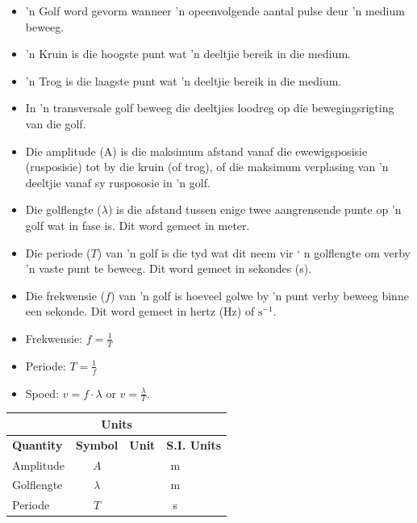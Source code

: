 \begin{definition}
            \nopagebreak
      \label{m38806*id324089}\begin{itemize}[noitemsep] 
            \label{m38806*uid108}\item 'n Golf word gevorm wanneer 'n opeenvolgende aantal pulse deur 'n medium beweeg.
\label{m38806*uid109}\item  'n Kruin is die hoogste punt wat  'n deeltjie bereik in die medium.
\label{m38806*uid110}\item 'n Trog is die laagste punt wat  'n deeltjie bereik in die medium.
\label{m38806*uid111}\item In 'n transversale golf beweeg die deeltjies loodreg op die bewegingsrigting van die golf.
\label{m38806*uid112}\item Die amplitude (A) is die maksimum afstand vanaf die ewewigsposisie (rusposisie) tot by die kruin 
       (of trog), of die maksimum verplasing van 'n deeltjie vanaf sy ruspososie in 'n golf.
\label{m38806*uid113}\item Die golflengte ($\lambda $) is die afstand tussen enige twee aangrensende punte op 'n golf wat in
         fase is. Dit word gemeet in meter.
\label{m38806*uid114}\item Die periode ($T$) van 'n golf is die tyd wat dit neem vir  ‘ n golflengte om verby  'n vaste punt te beweeg.
       Dit word gemeet in sekondes (s).
\label{m38806*uid115}\item Die frekwensie ($f$) van 'n golf is hoeveel golwe by 'n punt verby beweeg binne een sekonde. Dit word
       gemeet in hertz (Hz) of $\text{s}{}^{-1}$.
\label{m38806*uid116}\item Frekwensie: $f=\frac{1}{T}$\label{m38806*uid117}\item Periode: $T=\frac{1}{f}$\label{m38806*uid118}\item Spoed: $v=f\cdot\lambda $ or $v=\frac{\lambda }{T}$.
\end{itemize}
\begin{table}[H]
\begin{center}
\begin{tabular}{|l|c|c|c|}\hline \hline 
\multicolumn{4}{|c|}{\textbf{Units}}\\ \hline \hline
\textbf{Quantity} & \textbf{Symbol} & \textbf{Unit} & \textbf{S.I. Units}\\ \hline
Amplitude & $A$ & \multicolumn{2}{c|}{m} \\ \hline
Golflengte & $\lambda$ & \multicolumn{2}{c|}{m}  \\ \hline
Periode & $T$ & \multicolumn{2}{c|}{s}  \\ \hline

\end{tabular}
\end{center}
\end{table}
\end{definition}
